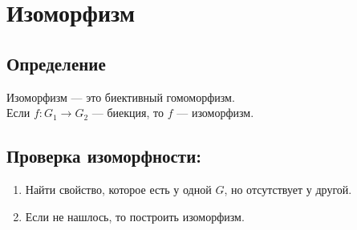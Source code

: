 \documentclass[12pt]{article}
\begin{document}
    \section{Изоморфизм}
    \subsection{Определение}
    Изоморфизм --- это биективный гомоморфизм.\\Если $f:G_1\rightarrow G_2$ --- биекция, то $f$ --- изоморфизм.

    \subsection{Проверка изоморфности:}
    \begin{enumerate}
        \item Найти свойство, которое есть у одной $G$, но отсутствует у другой.
        \item Если не нашлось, то построить изоморфизм.
    \end{enumerate}
\end{document}
